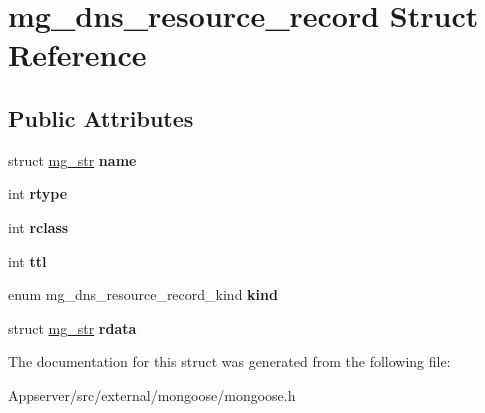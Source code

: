 \hypertarget{structmg__dns__resource__record}{}\section{mg\+\_\+dns\+\_\+resource\+\_\+record Struct Reference}
\label{structmg__dns__resource__record}
\subsection*{Public Attributes}
\begin{DoxyCompactItemize}
\item 
struct \hyperlink{structmg__str}{mg\+\_\+str} {\bfseries name}\hypertarget{structmg__dns__resource__record_afd27e187a02127a98a04757013aecd48}{}\label{structmg__dns__resource__record_afd27e187a02127a98a04757013aecd48}

\item 
int {\bfseries rtype}\hypertarget{structmg__dns__resource__record_a9d314632522fcca513858285c639bee9}{}\label{structmg__dns__resource__record_a9d314632522fcca513858285c639bee9}

\item 
int {\bfseries rclass}\hypertarget{structmg__dns__resource__record_a9be7dc2d7ef4e2dc20413289a55f6ff7}{}\label{structmg__dns__resource__record_a9be7dc2d7ef4e2dc20413289a55f6ff7}

\item 
int {\bfseries ttl}\hypertarget{structmg__dns__resource__record_aa5d1c1a7ba2d02908c27fab68ded25be}{}\label{structmg__dns__resource__record_aa5d1c1a7ba2d02908c27fab68ded25be}

\item 
enum mg\+\_\+dns\+\_\+resource\+\_\+record\+\_\+kind {\bfseries kind}\hypertarget{structmg__dns__resource__record_a6f9d5dda9d8ae9240a74282c44d4a555}{}\label{structmg__dns__resource__record_a6f9d5dda9d8ae9240a74282c44d4a555}

\item 
struct \hyperlink{structmg__str}{mg\+\_\+str} {\bfseries rdata}\hypertarget{structmg__dns__resource__record_ac169801d0c9ce94137fcce9a3f629152}{}\label{structmg__dns__resource__record_ac169801d0c9ce94137fcce9a3f629152}

\end{DoxyCompactItemize}


The documentation for this struct was generated from the following file\+:\begin{DoxyCompactItemize}
\item 
Appserver/src/external/mongoose/mongoose.\+h\end{DoxyCompactItemize}
